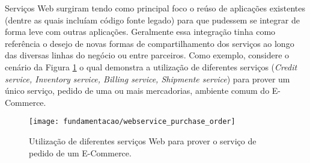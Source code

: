 Serviços Web surgiram tendo como principal foco o reúso de aplicações existentes (dentre as quais incluíam código fonte legado) para que pudessem se integrar de forma leve com outras aplicações. Geralmente essa integração tinha como referência o desejo de  novas formas de compartilhamento dos serviços ao longo das diversas linhas do negócio ou entre parceiros. Como exemplo, considere o cenário da Figura \ref{fig:ws_purchase_order} o qual demonstra a utilização de diferentes serviços (\textit{Credit service, Inventory service, Billing service, Shipmente service}) para prover um único serviço, pedido de uma ou mais mercadorias, ambiente comum do E-Commerce.

\begin{figure}[!htb] \centering 
  \centering
  \texttt{[image: fundamentacao/webservice\_purchase\_order]} 
  \caption{Utilização de diferentes serviços Web para prover o serviço de pedido de um E-Commerce. \cite{Papazoglou:2008}} 
  \label{fig:ws_purchase_order}
\end{figure}

